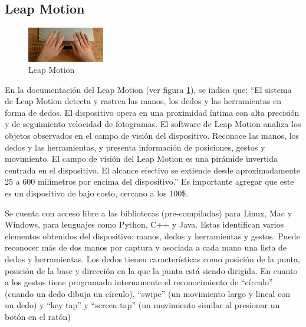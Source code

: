 \documentclass[letterpaper,journal,transmag]{IEEEtran}
\begin{document}
\subsection{Leap Motion}
\label{subsec:leap}
      \begin{figure}[ht]
         \includegraphics[width=0.3\textwidth]{leap}
         \caption{Leap Motion}
         \label{fig:leap}
      \end{figure}
En la documentación del Leap Motion  (ver figura
\ref{fig:leap}), se indica que: ``El sistema de Leap Motion detecta y rastrea
las manos, los dedos y las herramientas en forma de dedos. El dispositivo opera
en una proximidad íntima con alta precisión y de seguimiento velocidad de
fotogramas. El software de Leap Motion analiza los objetos observados en el
campo de visión del dispositivo. Reconoce las manos, los dedos y las
herramientas, y presenta información de posiciones, gestos y movimiento. El
campo de visión del Leap Motion es una pirámide invertida centrada en el
dispositivo. El alcance efectivo se extiende desde aproximadamente 25 a 600
milímetros por encima del dispositivo.'' Es importante agregar que este es
un dispositivo de bajo costo, cercano a los 100\$.

Se cuenta con acceso libre a las bibliotecas (pre-compiladas) para Linux, Mac y
Windows, para lenguajes como Python, C++ y Java. Estas identifican varios
elementos obtenidos del dispositivo: manos, dedos y herramientas y gestos.
Puede reconocer más de dos manos por captura y asociada a cada mano una lista
de dedos y herramientas. Los dedos tienen características como posición de la
punta, posición de la base y dirección en la que la punta está siendo dirigida.
En cuanto a los gestos tiene programado internamente el reconocimiento de
``círculo'' (cuando un dedo dibuja un círculo), ``swipe'' (un movimiento largo
y lineal con un dedo) y ``key tap'' y ``screen tap'' (un movimiento similar al
presionar un botón en el ratón)\\
\end{document}
